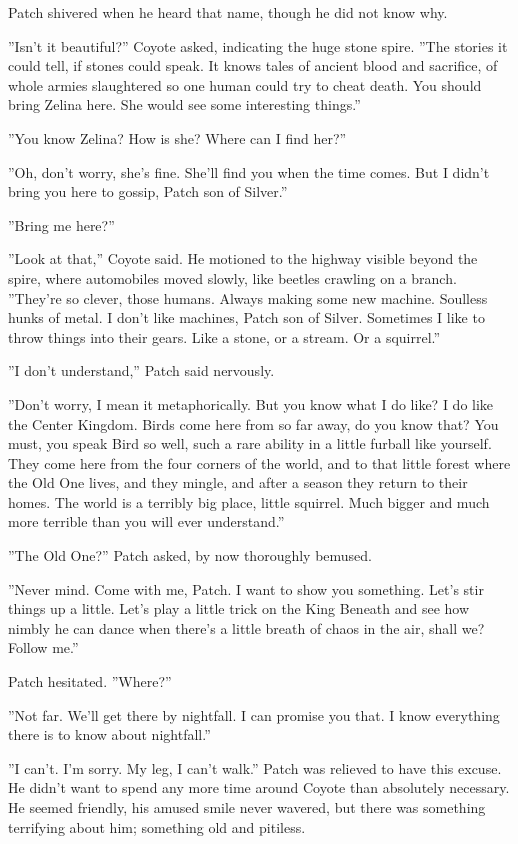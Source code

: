 \documentclass[12pt]{book}
\begin{document}
Patch shivered when he heard that name, though he did not know why.

''Isn't it beautiful?'' Coyote asked, indicating the huge stone
spire. ''The stories it could tell, if stones could speak. It knows
tales of ancient blood and sacrifice, of whole armies slaughtered so
one human could try to cheat death. You should bring Zelina here. She
would see some interesting things.''

''You know Zelina? How is she? Where can I find her?''

''Oh, don't worry, she's fine. She'll find you when the time
comes. But I didn't bring you here to gossip, Patch son of Silver.''

''Bring me here?''

''Look at that,'' Coyote said. He motioned to the highway visible
beyond the spire, where automobiles moved slowly, like beetles
crawling on a branch. ''They're so clever, those humans. Always making
some new machine. Soulless hunks of metal. I don't like machines,
Patch son of Silver. Sometimes I like to throw things into their
gears. Like a stone, or a stream. Or a squirrel.''

''I don't understand,'' Patch said nervously.

''Don't worry, I mean it metaphorically. But you know what I do like?
I do like the Center Kingdom. Birds come here from so far away, do you
know that? You must, you speak Bird so well, such a rare ability in a
little furball like yourself. They come here from the four corners of
the world, and to that little forest where the Old One lives, and they
mingle, and after a season they return to their homes. The world is a
terribly big place, little squirrel. Much bigger and much more
terrible than you will ever understand.''

''The Old One?'' Patch asked, by now thoroughly bemused.

''Never mind. Come with me, Patch. I want to show you something. Let's
stir things up a little. Let's play a little trick on the King Beneath
and see how nimbly he can dance when there's a little breath of chaos
in the air, shall we? Follow me.''

Patch hesitated. ''Where?''

''Not far. We'll get there by nightfall. I can promise you that. I
know everything there is to know about nightfall.''

''I can't. I'm sorry. My leg, I can't walk.'' Patch was relieved to
have this excuse. He didn't want to spend any more time around Coyote
than absolutely necessary. He seemed friendly, his amused smile never
wavered, but there was something terrifying about him; something old
and pitiless.
\end{document}

